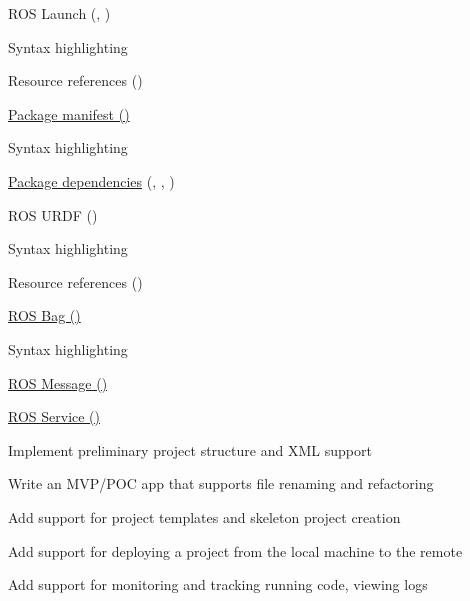 \begin{multicols}{2}
\begin{todolist}
\item[\done] ROS Launch (\href{https://wiki.ros.org/roslaunch/XML}{}, \href{https://wiki.ros.org/rostest/Writing}{})
\begin{todolist}
\item[\done] Syntax highlighting
\item[\done] Resource references ()
\end{todolist}
\item[\done] \href{https://wiki.ros.org/Manifest}{Package manifest ()}
\begin{todolist}
\item[\done] Syntax highlighting
\item[\done] \href{https://wiki.ros.org/catkin/package.xml#Dependencies}{Package dependencies} (, , )
\end{todolist}
\item[\done] ROS URDF ()
\begin{todolist}
\item[\done] Syntax highlighting
\item[\done] Resource references ()
\end{todolist}
\item[\done] \href{https://wiki.ros.org/Bags/Format}{ROS Bag ()}
\begin{todolist}
\item[\done] Syntax highlighting
\end{todolist}
\item[\done] \href{https://wiki.ros.org/msg}{ROS Message ()}
\item[\done] \href{https://wiki.ros.org/srv}{ROS Service ()}
\item[\done] Implement preliminary project structure and XML support
\item[\done] Write an MVP/POC app that supports file renaming and refactoring
\item[\done] Add support for project templates and skeleton project creation
\item[\done] Add support for deploying a project from the local machine to the remote
\item Add support for monitoring and tracking running code, viewing logs

\end{todolist}
\end{multicols}
